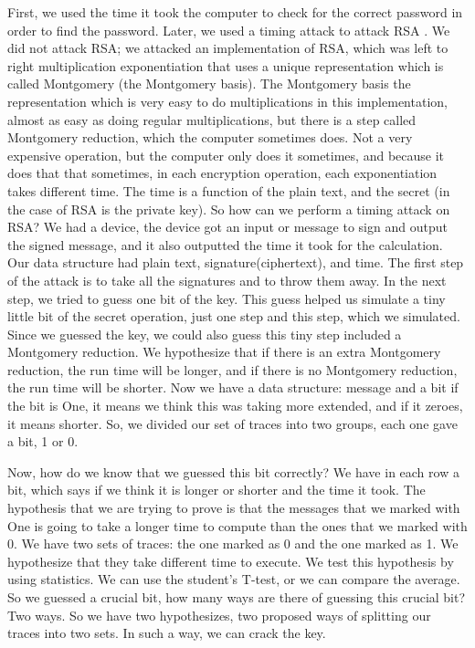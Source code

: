 First, we used the time it took the computer to check for the correct password in
order to find the password. Later, we used a timing attack \cite{TimingAttack} to attack RSA \cite{rivest1978method}.
We did not attack RSA; we attacked an implementation of RSA, which was
left to right multiplication exponentiation that uses a unique representation
which is called Montgomery (the Montgomery basis). The Montgomery basis \cite{Montgomery}
the representation which is very easy to do multiplications in this implementation,
almost as easy as doing regular multiplications, but there is a step called
Montgomery reduction, which the computer sometimes does. Not a very expensive
operation, but the computer only does it sometimes, and because it does that that
sometimes, in each encryption operation, each exponentiation takes different time.
The time is a function of the plain text, and the secret (in the case of RSA is
the private key). So how can we perform a timing attack on RSA? We had a device,
the device got an input or message to sign and output the signed message, and it
also outputted the time it took for the calculation. Our data structure had
plain text, signature(ciphertext), and time.  The first step of the attack is to
take all the signatures and to throw them away. In the next step, we tried to
guess one bit of the key. This guess helped us simulate a tiny little bit of the
secret operation, just one step and this step, which we simulated. Since we
guessed the key, we could also guess this tiny step included a Montgomery
reduction. We hypothesize that if there is an extra Montgomery reduction, the
run time will be longer, and if there is no Montgomery reduction, the run time
will be shorter. Now we have a data structure: message and a bit if the bit is
One, it means we think this was taking more extended, and if it zeroes, it means shorter. So, we
divided our set of traces into two groups, each one gave a bit, 1 or 0. 

Now, how do we know that we guessed this bit correctly? We have in each row a
bit, which says if we think it is longer or shorter and the time it took. The
hypothesis that we are trying to prove is that the messages that we marked with
One is going to take a longer time to compute than the ones that we marked with
0. We have two sets of traces: the one marked as 0 and the one marked
as 1. We hypothesize that they take different time to execute. We test this
hypothesis by using statistics. We can use the student's T-test, or we can compare
the average. So we guessed a crucial bit, how many ways are there of guessing this
crucial bit? Two ways. So we have two hypothesizes, two proposed ways of splitting
our traces into two sets. In such a way, we can crack the key.

